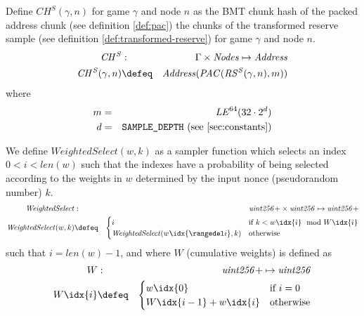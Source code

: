 \begin{definition}
\label{def:chs}
Define $\mathit{CH^S}(\gamma,n)$ for game $\gamma$ and node $n$ as the BMT chunk hash of the packed address chunk (see definition \ref{def:pac}) the chunks of the transformed reserve sample (see definition \ref{def:transformed-reserve}) for game $\gamma$ and node $n$.
%
\begin{eqnarray}
\mathit{CH^S}&:&\Gamma\times\mathit{Nodes}\mapsto\mathit{Address}\\
\mathit{CH^S}(\gamma,n)&\defeq&\mathit{Address}(\mathit{PAC}(\mathit{RS^S}(\gamma, n),m))
\end{eqnarray}
where
\begin{eqnarray}
m & = & \mathit{LE}^{64}(32\cdot 2^d)\\
d & = & \texttt{SAMPLE\_DEPTH} \text{ (see \ref{sec:constants})} 
\end{eqnarray}
\end{definition}

\begin{definition}
\label{def:weighted-selection}
We define $\mathit{WeightedSelect}(w,k)$ as a sampler function which selects an index $0<i<\mathit{len}(w)$ such that the indexes have a probability of being selected according to the weights in $w$ determined by the input nonce (pseudorandom number) $k$.
%
\begin{eqnarray}
\mathit{WeightedSelect}&:&\mathit{uint256}{+}\times\mathit{uint256}\mapsto\mathit{uint256}{+}\\
\mathit{WeightedSelect}(w,k)&\defeq&
\begin{cases}
    i&\text{if }k <w\idx{i}\mod W\idx{i}\\
\mathit{WeightedSelect}(w\idx{\rangedel i},k)&
\text{otherwise}
\end{cases}
\end{eqnarray}
such that $i=\mathit{len}(w)-1$,   
and
where $W$ (cumulative weights) is defined as
\begin{eqnarray}
W & : & \mathit{uint256}{+}\mapsto\mathit{uint256}\\
W\idx{i} &\defeq & \begin{cases}
    w\idx{0}&\text{if }i=0\\
    W\idx{i-1}+w\idx{i}&\text{otherwise}
\end{cases} 
\end{eqnarray}
\end{definition}



